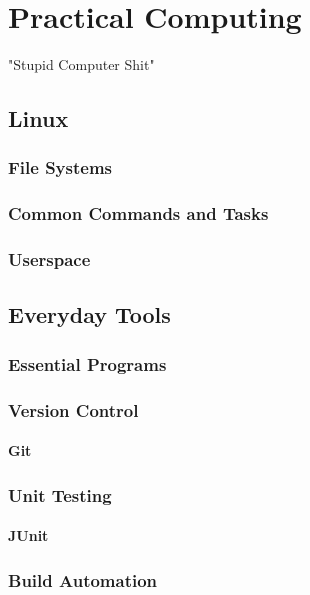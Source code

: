 \chapter{Practical Computing}

"Stupid Computer Shit"

\section{Linux}

\subsection{File Systems}

\subsection{Common Commands and Tasks}

\subsection{Userspace}

\section{Everyday Tools}

\subsection{Essential Programs}

\subsection{Version Control}

\subsubsection{Git}

\subsection{Unit Testing}

\subsubsection{JUnit}

\subsection{Build Automation}

